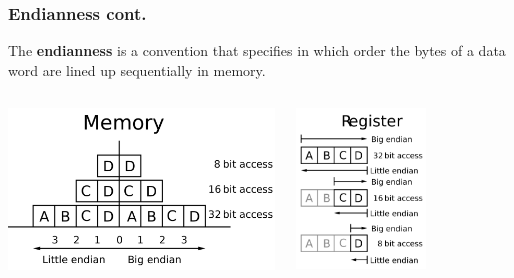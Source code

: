 \documentclass[]{beamer}
\begin{document}
\begin{frame}
  \frametitle{Endianness cont.}
  The \textbf{endianness} is a convention that specifies in which order the bytes of a data word are lined up sequentially in memory.
  \begin{columns}
    \begin{column}{0.5\columnwidth}
      \includegraphics[width=\textwidth]{images/Endianessmap1.pdf}
      \label{Big-Endian}
    \end{column}
    \begin{column}{0.5\columnwidth}
      \includegraphics[width=0.6\textwidth]{images/Endianessmap2.pdf}
      \label{Little-Endian}
    \end{column}
  \end{columns}
\end{frame}
\end{document}
